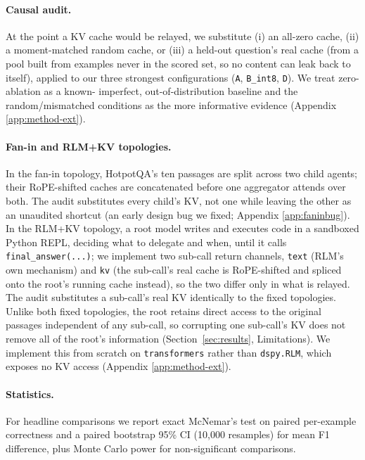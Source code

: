 \documentclass[11pt]{article}
\begin{document}
\paragraph{Causal audit.} At the point a KV cache would be relayed, we
substitute (i) an all-zero cache, (ii) a moment-matched random cache,
or (iii) a held-out question's real cache (from a pool built from
examples never in the scored set, so no content can leak back to
itself), applied to our three strongest configurations (\texttt{A},
\texttt{B\_int8}, \texttt{D}). We treat zero-ablation as a known-
imperfect, out-of-distribution baseline and the random/mismatched
conditions as the more informative evidence (Appendix
\ref{app:method-ext}).

\paragraph{Fan-in and RLM+KV topologies.} In the fan-in topology,
HotpotQA's ten passages are split across two child agents; their
RoPE-shifted caches are concatenated before one aggregator attends over
both. The audit substitutes every child's KV, not one while leaving the
other as an unaudited shortcut (an early design bug we fixed; Appendix
\ref{app:faninbug}). In the RLM+KV topology, a root model writes and
executes code in a sandboxed Python REPL, deciding what to delegate and
when, until it calls \texttt{final\_answer(...)}; we implement two
sub-call return channels, \texttt{text} (RLM's own mechanism) and
\texttt{kv} (the sub-call's real cache is RoPE-shifted and spliced onto
the root's running cache instead), so the two differ only in what is
relayed. The audit substitutes a sub-call's real KV identically to the
fixed topologies. Unlike both fixed topologies, the root retains direct
access to the original passages independent of any sub-call, so
corrupting one sub-call's KV does not remove all of the root's
information (Section~\ref{sec:results}, Limitations). We implement this
from scratch on \texttt{transformers} \citep{transformers2020} rather
than \texttt{dspy.RLM}, which exposes no KV access (Appendix
\ref{app:method-ext}).

\paragraph{Statistics.} For headline comparisons we report exact
McNemar's test on paired per-example correctness and a paired bootstrap
95\% CI (10,000 resamples) for mean F1 difference, plus Monte Carlo
power for non-significant comparisons.
\end{document}
